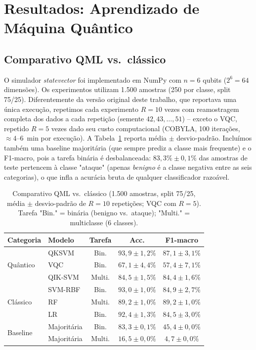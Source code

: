 \documentclass[12pt]{article}
\begin{document}
\section{Resultados: Aprendizado de Máquina Quântico}
\label{sec:qml}

\subsection{Comparativo QML vs.\ clássico}

O simulador \textit{statevector} foi implementado em NumPy com $n=6$ qubits ($2^6=64$ dimensões). Os experimentos utilizam 1.500 amostras (250 por classe, split 75/25). Diferentemente da versão original deste trabalho, que reportava uma única execução, repetimos cada experimento $R=10$ vezes com reamostragem completa dos dados a cada repetição (semente $42, 43, \ldots, 51$) -- exceto o VQC, repetido $R=5$ vezes dado seu custo computacional (COBYLA, 100 iterações, $\approx\!4$--$6$~min por execução). A Tabela~\ref{tab:qml} reporta média $\pm$ desvio-padrão. Incluímos também uma baseline majoritária (que sempre prediz a classe mais frequente) e o F1-macro, pois a tarefa binária é desbalanceada: $83{,}3\% \pm 0{,}1\%$ das amostras de teste pertencem à classe "ataque" (apenas \textit{benigno} é a classe negativa entre as seis categorias), o que infla a acurácia bruta de qualquer classificador razoável.

\begin{table}[H]
\centering
\caption{Comparativo QML vs.\ clássico (1.500 amostras, split 75/25, média $\pm$ desvio-padrão de $R=10$ repetições; VQC com $R=5$). Tarefa "Bin." = binária (benigno vs.\ ataque); "Multi." = multiclasse (6 classes).}
\label{tab:qml}
\small
\begin{tabular}{llccc}
\toprule
\textbf{Categoria} & \textbf{Modelo} & \textbf{Tarefa} & \textbf{Acc.} & \textbf{F1-macro} \\
\midrule
\multirow{3}{*}{Quântico}
  & QKSVM     & Bin.   & $93{,}9 \pm 1{,}2\%$ & $87{,}1 \pm 3{,}1\%$ \\
  & VQC       & Bin.   & $67{,}1 \pm 4{,}4\%$ & $57{,}4 \pm 7{,}1\%$ \\
  & QIK-SVM   & Multi. & $84{,}5 \pm 1{,}5\%$ & $84{,}4 \pm 1{,}6\%$ \\
\midrule
\multirow{3}{*}{Clássico}
  & SVM-RBF   & Bin.   & $93{,}0 \pm 1{,}0\%$ & $84{,}9 \pm 2{,}7\%$ \\
  & RF        & Multi. & $89{,}2 \pm 1{,}0\%$ & $89{,}2 \pm 1{,}0\%$ \\
  & LR        & Bin.   & $92{,}4 \pm 1{,}3\%$ & $84{,}5 \pm 3{,}0\%$ \\
\midrule
\multirow{2}{*}{Baseline}
  & Majoritária & Bin.   & $83{,}3 \pm 0{,}1\%$ & $45{,}4 \pm 0{,}0\%$ \\
  & Majoritária & Multi. & $16{,}5 \pm 0{,}0\%$ & $4{,}7 \pm 0{,}0\%$ \\
\bottomrule
\end{tabular}
\end{table}
\end{document}
